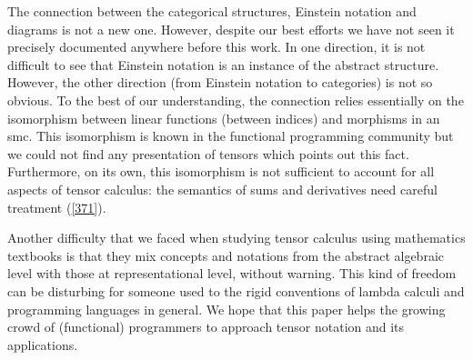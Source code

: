 \documentclass[nolinenum]{jfp}
\begin{document}
The connection between the categorical structures, Einstein notation and diagrams is not a new one.
However, despite our best
efforts we have not seen it precisely documented anywhere before
this work.  In one direction, it is not difficult to see that Einstein notation is an instance of the abstract structure.
However, the other
direction (from Einstein notation to categories) is not so obvious.
To the best of our understanding, the connection
relies essentially on the isomorphism between linear functions
(between indices) and morphisms in an {\sc{}smc}. This isomorphism is known
in the functional programming community \citep{benton_lnl_1995} but we
could not find any presentation of tensors which points out this fact.
Furthermore, on its own, this isomorphism is not sufficient to account
for all aspects of tensor calculus: the semantics of sums and derivatives
need careful treatment (\cref{371}).

Another difficulty that we faced when studying tensor calculus using
mathematics textbooks is that they mix concepts and notations from the
abstract algebraic level with those at representational level, without
warning. This kind of freedom can be disturbing for someone used
to the rigid conventions of lambda calculi and programming languages
in general. We hope that this paper helps the growing crowd of (functional)
programmers to approach tensor notation and its applications.





 
\label{lastpage01} 
\end{document}
